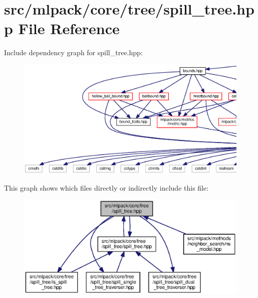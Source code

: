 \section{src/mlpack/core/tree/spill\+\_\+tree.hpp File Reference}
\label{spill__tree_8hpp}
Include dependency graph for spill\+\_\+tree.\+hpp\+:
\nopagebreak
\begin{figure}[H]
\begin{center}
\leavevmode
\includegraphics[width=350pt]{spill__tree_8hpp__incl}
\end{center}
\end{figure}
This graph shows which files directly or indirectly include this file\+:
\nopagebreak
\begin{figure}[H]
\begin{center}
\leavevmode
\includegraphics[width=350pt]{spill__tree_8hpp__dep__incl}
\end{center}
\end{figure}
